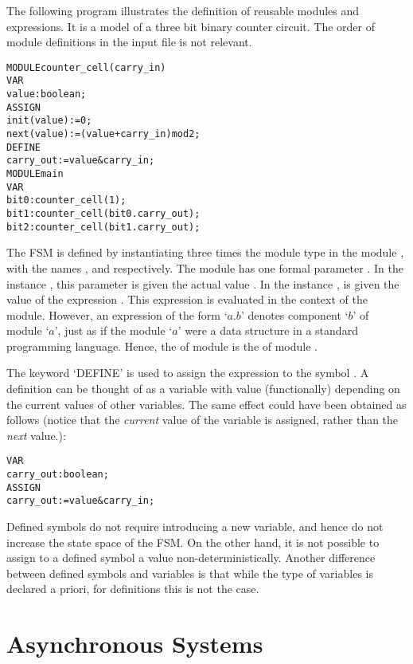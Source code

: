 The following program illustrates the definition of reusable modules and
expressions. It is a model of a three bit binary counter circuit.
The order of module definitions in the input file is not relevant.

\noindent
\begin{alltt}
MODULE counter_cell(carry_in)
 VAR
   value : boolean;
 ASSIGN
   init(value) := 0;
   next(value) := (value + carry_in) mod 2;
 DEFINE
  carry_out := value & carry_in;
MODULE main
 VAR
   bit0 : counter_cell(1);
   bit1 : counter_cell(bit0.carry_out);
   bit2 : counter_cell(bit1.carry_out);
\end{alltt}

The FSM is defined by instantiating three times the module
type  in the module , with the names
,  and  respectively. The  
module has one formal parameter . In
the instance , this parameter is given the actual value
. In the instance ,  is given the
value of the expression . This expression is
evaluated in the context of the  module. However, an
expression of the form `$a.b$' denotes component
`$b$' of module `$a$', just as if the module
`$a$' were a data structure in a standard programming
language. Hence, the  of module  is the
 of module .

The keyword `DEFINE' is used to assign the expression  
to the symbol . A definition can be thought of
as a variable with value (functionally) depending on the current values
of other variables. The same effect could have been obtained as follows
(notice that the \emph{current} value of the variable is assigned,
rather than the \emph{next} value.):\\
\pagebreak[3]
\begin{alltt}
VAR
  carry_out : boolean;
ASSIGN
  carry_out := value & carry_in;
\end{alltt}
Defined symbols do not require introducing a new variable, and hence do
not increase the state space of the FSM. On the other hand, it is not
possible to assign to a defined symbol a value
non-deterministically. Another difference between defined symbols and
variables is that while the type of variables is declared a priori, for
definitions this is not the case.


\section{Asynchronous Systems}
\label{Asynchronous Systems}

